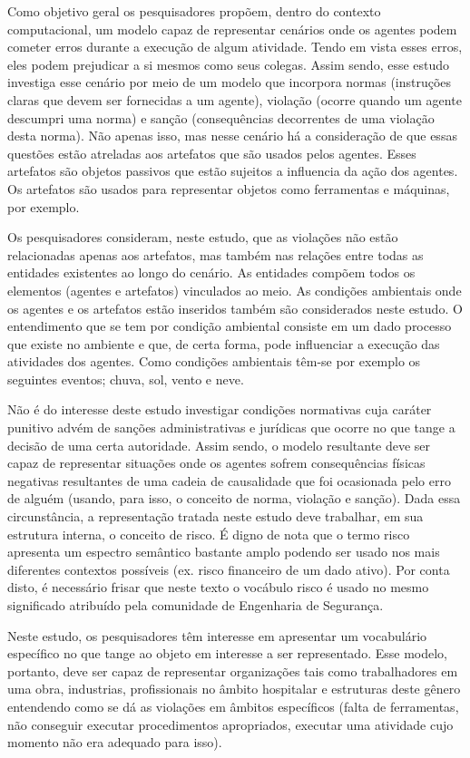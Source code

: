 Como objetivo geral os pesquisadores propõem, dentro do contexto computacional, um modelo capaz de representar cenários onde os agentes podem cometer erros durante a execução de algum atividade. Tendo em vista esses erros, eles podem prejudicar a si mesmos como seus colegas. Assim sendo, esse estudo investiga esse cenário por meio de um modelo que incorpora normas (instruções claras que devem ser fornecidas a um agente), violação (ocorre quando um agente descumpri uma norma) e sanção (consequências decorrentes de uma violação desta norma). Não apenas isso, mas nesse cenário há a consideração de que essas questões estão atreladas aos artefatos que são usados pelos agentes. Esses artefatos são objetos passivos que estão sujeitos a influencia da ação dos agentes. Os artefatos são usados para representar objetos como ferramentas e máquinas, por exemplo. 

Os pesquisadores consideram, neste estudo, que as violações não estão relacionadas apenas aos artefatos, mas também nas relações entre todas as entidades existentes ao longo do cenário. As entidades compõem todos os elementos (agentes e artefatos) vinculados ao meio. As condições ambientais onde os agentes e os artefatos estão inseridos também são considerados neste estudo. O entendimento que se tem por condição ambiental consiste em um dado processo que existe no ambiente e que, de certa forma, pode influenciar a execução das atividades dos agentes. Como condições ambientais têm-se por exemplo os seguintes eventos; chuva, sol, vento e neve. 

Não é do interesse deste estudo investigar condições normativas cuja caráter punitivo advém de sanções administrativas e jurídicas que ocorre no que tange a decisão de uma certa autoridade. Assim sendo, o modelo resultante deve ser capaz de representar situações onde os agentes sofrem consequências físicas negativas resultantes de uma cadeia de causalidade que foi ocasionada pelo erro de alguém (usando, para isso, o conceito de norma, violação e sanção). Dada essa circunstância, a representação tratada neste estudo deve trabalhar, em sua estrutura interna, o conceito de risco. É digno de nota que o termo risco apresenta um espectro semântico bastante amplo podendo ser usado nos mais diferentes contextos possíveis (ex. risco financeiro de um dado ativo). Por conta disto, é necessário frisar que neste texto o vocábulo risco é usado no mesmo significado atribuído pela comunidade de Engenharia de Segurança. 

Neste estudo, os pesquisadores têm interesse em apresentar um vocabulário específico no que tange ao objeto em interesse a ser representado. Esse modelo, portanto, deve ser capaz de representar organizações tais como trabalhadores em uma obra, industrias, profissionais no âmbito hospitalar e estruturas deste gênero entendendo como se dá as violações em âmbitos específicos (falta de ferramentas, não conseguir executar procedimentos apropriados, executar uma atividade cujo momento não era adequado para isso). 

